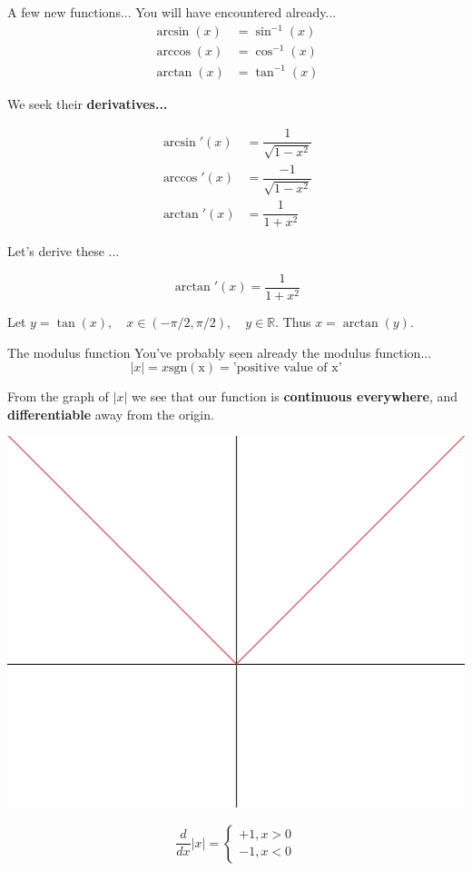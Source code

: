 \documentclass{beamer}
\begin{document}
\begin{frame}{A few new functions...}
	You will have encountered already...
	\begin{align*}
		\arcsin(x) &= \sin^{-1}(x)\\
		\arccos(x) &= \cos^{-1}(x)\\
		\arctan(x) &= \tan^{-1}(x)
	\end{align*}

We seek their \textbf{derivatives...}

\begin{align*}
	\arcsin'(x) &= \dfrac{1}{\sqrt{1-x^2}}\\
	\arccos'(x) &= \dfrac{-1}{\sqrt{1-x^2}}\\
	\arctan'(x) &= \dfrac{1}{1+x^2}
\end{align*}
\end{frame}

\begin{frame}
	Let's derive these ...
	
	$$\arctan'(x) = \dfrac{1}{1+x^2}$$
	
	Let $y = \tan(x), \quad x \in (-\pi/2, \pi/2), \quad y \in \mathbb{R}$. Thus $x = \arctan(y)$.
	\vspace{5cm}
\end{frame}

\begin{frame}{The modulus function}
	You've probably seen already the modulus function...
	$$|x| = x\mathrm{sgn(x)} = \text{'positive value of x'}$$
	
	From the graph of $|x|$ we see that our function is \textbf{continuous everywhere}, and \textbf{differentiable} away from the origin.
	
	\begin{center}\includegraphics[scale=0.10]{img/abs.png}\end{center}
	
	$$\dfrac{d}{dx} |x| = \begin{cases}+1, x > 0\\ -1, x < 0\end{cases}$$
\end{frame}
\end{document}
